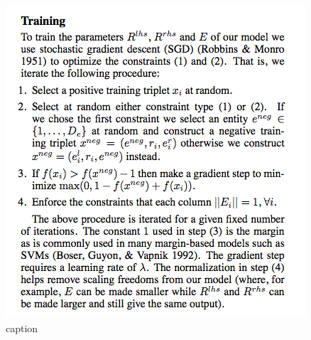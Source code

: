 \documentclass[11pt]{article}
\begin{document}
\begin{figure}[htbp]
  \centering
  \includegraphics[width=\linewidth]{bordes_sgd.png}
  \caption{caption}
  \label{"waiting for reftex-label call..."}
\end{figure}
\end{document}
